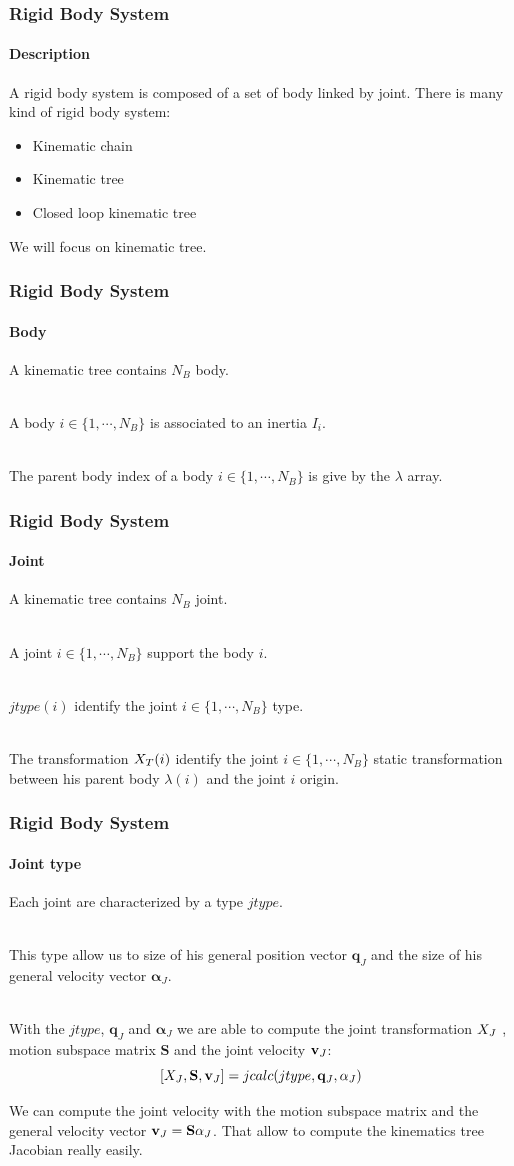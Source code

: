 \documentclass{beamer}
\begin{document}
  	\begin{frame}
		\frametitle{Rigid Body System}
		\framesubtitle{Description}
		A rigid body system is composed of a set of body linked by joint.
		There is many kind of rigid body system:
		\begin{itemize}
			\item Kinematic chain
			\item Kinematic tree
			\item Closed loop kinematic tree
		\end{itemize}
		We will focus on kinematic tree.
	\end{frame}
  	\begin{frame}
		\frametitle{Rigid Body System}
		\framesubtitle{Body}
		A kinematic tree contains $ N_B $ body.

		\hfill \\
		A body $ i \in \{1, \cdots, N_B\} $ is associated to an inertia $ I_i $.

		\hfill \\
		The parent body index of a body $ i \in \{1, \cdots, N_B\} $ is give by the $ \lambda $ array.
	\end{frame}
  	\begin{frame}
		\frametitle{Rigid Body System}
		\framesubtitle{Joint}
		A kinematic tree contains $ N_B $ joint.

		\hfill \\
		A joint $ i \in \{1, \cdots, N_B\} $ support the body $ i $.

		\hfill \\
		$ jtype(i) $ identify the joint $ i \in \{1, \cdots, N_B\} $ type.

		\hfill \\
	        The transformation $ X_T(i) $	identify the joint $ i \in \{1, \cdots, N_B\} $
		static transformation between his parent body $ \lambda(i) $ and the joint $ i $ origin.
	\end{frame}
  	\begin{frame}
		\frametitle{Rigid Body System}
		\framesubtitle{Joint type}
		Each joint are characterized by a type $ jtype $.

		\hfill \\
		This type allow us to size of his general position vector $ \mathbf{q}_J $ and the size
		of his general velocity vector $ \mathbf{\alpha}_J $.

		\hfill \\
		With the $ jtype $, $ \mathbf{q}_J $ and $ \mathbf{\alpha}_J $ we are able to compute the joint
		transformation $ X_J $ , motion subspace matrix $ \mathbf{S} $ and
		the joint velocity $ \mathbf{v}_J $:
		$$
		[X_J, \mathbf{S}, \mathbf{v}_J] = jcalc(jtype, \mathbf{q}_J, \mathbf{\alpha}_J)
		$$

		We can compute the joint velocity with the motion subspace matrix and
		the general velocity vector $ \mathbf{v}_J = \mathbf{S}\mathbf{\alpha}_J $.
		That allow to compute the kinematics tree Jacobian really easily.
	\end{frame}
\end{document}
